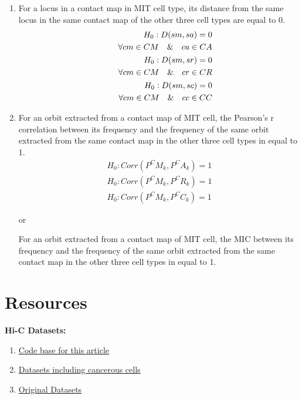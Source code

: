 \documentclass[a4,center,fleqn]{NAR}
\begin{document}
\begin{enumerate}
    \item For a locus in a contact map in MIT cell type, its distance
        from the same locus in the same contact map of the other three
        cell types are equal to $0$.
            \begin{align}
                \begin{split}
                    H_0: D(sm, sa) = 0  \\
                \hspace{.5cm} \forall cm \in CM \quad\&\quad ca \in CA
                \end{split} \\
                \begin{split}
                    H_0: D(sm, sr) = 0   \\
                \hspace{.5cm} \forall cm \in CM\quad \&\quad cr \in CR
                \end{split} \\
                \begin{split}
                    H_0: D(sm, sc) = 0   \\
                \hspace{.5cm} \forall cm \in CM\quad \&\quad cc \in CC
                \end{split}
            \end{align}
    \item For an orbit extracted from a contact map of MIT cell, the 
        Pearson's r correlation between its frequency and the frequency
        of the same orbit extracted from the same contact map in 
        the other three cell types in equal to 1.
        \begin{align}
            H_0: Corr(P^CM_k, P^CA_k) = 1 \\
            H_0: Corr(P^CM_k, P^CR_k) = 1 \\
            H_0: Corr(P^CM_k, P^CC_k) = 1
        \end{align}

        or

        For an orbit extracted from a contact map of MIT cell, the 
        MIC between its frequency and the frequency
        of the same orbit extracted from the same contact map in 
        the other three cell types in equal to 1.
\end{enumerate}



\newpage
\section{Resources}
\textbf{Hi-C Datasets:}
\begin{enumerate}
    \item \href{https://github.com/rasoolianbehnam/watson}{Code base for this article}
    \item \href{http://sysbio.rnet.missouri.edu/T0510/tmp_download/link_to_download_genome_data/}
        {Datasets including cancerous cells}
    \item \href{https://bcm.app.box.com/v/aidenlab/folder/11234760671}{Original Datasets}
\end{enumerate}




\end{document}
